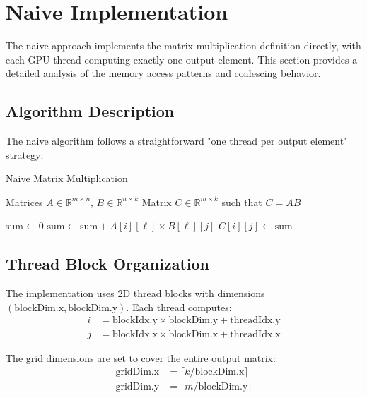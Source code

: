 \documentclass{amsbook}
\theoremstyle{definition}
\begin{document}
\section{Naive Implementation}

The naive approach implements the matrix multiplication definition directly, with each GPU thread computing exactly one output element. This section provides a detailed analysis of the memory access patterns and coalescing behavior.

\subsection{Algorithm Description}

The naive algorithm follows a straightforward "one thread per output element" strategy:

\begin{algorithm}
\caption{Naive Matrix Multiplication}
\begin{algorithmic}[1]
\Require Matrices $A \in \mathbb{R}^{m \times n}$, $B \in \mathbb{R}^{n \times k}$
\Ensure Matrix $C \in \mathbb{R}^{m \times k}$ such that $C = AB$

    \State $\text{sum} \leftarrow 0$
        \State $\text{sum} \leftarrow \text{sum} + A[i][\ell] \times B[\ell][j]$
    \EndFor
    \State $C[i][j] \leftarrow \text{sum}$
\EndFor
\end{algorithmic}
\end{algorithm}

\subsection{Thread Block Organization}

The implementation uses 2D thread blocks with dimensions $(\text{blockDim.x}, \text{blockDim.y})$. Each thread computes:
\begin{align}
i &= \text{blockIdx.y} \times \text{blockDim.y} + \text{threadIdx.y} \\
j &= \text{blockIdx.x} \times \text{blockDim.x} + \text{threadIdx.x}
\end{align}

The grid dimensions are set to cover the entire output matrix:
\begin{align}
\text{gridDim.x} &= \lceil k/\text{blockDim.x} \rceil \\
\text{gridDim.y} &= \lceil m/\text{blockDim.y} \rceil
\end{align}
\end{document}
